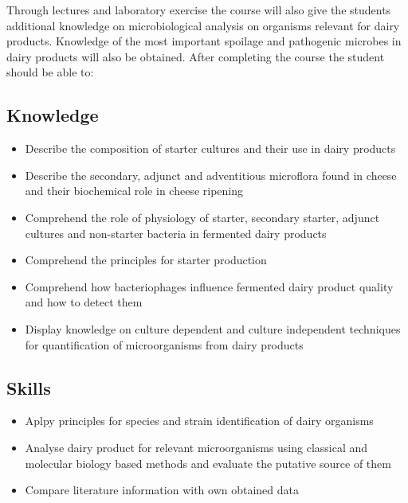 Through lectures and laboratory exercise the course will also give the students additional knowledge on microbiological analysis on organisms relevant for dairy products. Knowledge of the most important spoilage and pathogenic microbes in dairy products will also be obtained.
After completing the course the student should be able to:

\subsection{Knowledge}
\begin{highlight}
    \begin{itemize}
        \item Describe the composition of starter cultures and their use in dairy products

        \item Describe the secondary, adjunct and adventitious microflora found in cheese and their biochemical role in cheese ripening

        \item Comprehend the role of physiology of starter, secondary starter, adjunct cultures and non-starter bacteria in fermented dairy products

        \item Comprehend the principles for starter production
        
        \item Comprehend how bacteriophages influence fermented dairy product quality and how to detect them
        
        \item Display knowledge on culture dependent and culture independent techniques for quantification of microorganisms from dairy products
    \end{itemize}
\end{highlight}

\subsection{Skills}
\begin{highlight}
    \begin{itemize}
        \item Aplpy principles for species and strain identification of dairy organisms
        
        \item Analyse dairy product for relevant microorganisms using classical and molecular biology based methods and evaluate the putative source of them
        
        \item Compare literature information with own obtained data
\end{itemize}
\end{highlight} 

